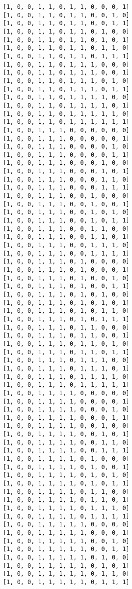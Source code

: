 \documentclass[11pt]{article}
\begin{document}
\begin{Verbatim}[commandchars=\\\{\}]
[1, 0, 0, 1, 1, 0, 1, 1, 0, 0, 0, 1]
[1, 0, 0, 1, 1, 0, 1, 1, 0, 0, 1, 0]
[1, 0, 0, 1, 1, 0, 1, 1, 0, 0, 1, 1]
[1, 0, 0, 1, 1, 0, 1, 1, 0, 1, 0, 0]
[1, 0, 0, 1, 1, 0, 1, 1, 0, 1, 0, 1]
[1, 0, 0, 1, 1, 0, 1, 1, 0, 1, 1, 0]
[1, 0, 0, 1, 1, 0, 1, 1, 0, 1, 1, 1]
[1, 0, 0, 1, 1, 0, 1, 1, 1, 0, 0, 0]
[1, 0, 0, 1, 1, 0, 1, 1, 1, 0, 0, 1]
[1, 0, 0, 1, 1, 0, 1, 1, 1, 0, 1, 0]
[1, 0, 0, 1, 1, 0, 1, 1, 1, 0, 1, 1]
[1, 0, 0, 1, 1, 0, 1, 1, 1, 1, 0, 0]
[1, 0, 0, 1, 1, 0, 1, 1, 1, 1, 0, 1]
[1, 0, 0, 1, 1, 0, 1, 1, 1, 1, 1, 0]
[1, 0, 0, 1, 1, 0, 1, 1, 1, 1, 1, 1]
[1, 0, 0, 1, 1, 1, 0, 0, 0, 0, 0, 0]
[1, 0, 0, 1, 1, 1, 0, 0, 0, 0, 0, 1]
[1, 0, 0, 1, 1, 1, 0, 0, 0, 0, 1, 0]
[1, 0, 0, 1, 1, 1, 0, 0, 0, 0, 1, 1]
[1, 0, 0, 1, 1, 1, 0, 0, 0, 1, 0, 0]
[1, 0, 0, 1, 1, 1, 0, 0, 0, 1, 0, 1]
[1, 0, 0, 1, 1, 1, 0, 0, 0, 1, 1, 0]
[1, 0, 0, 1, 1, 1, 0, 0, 0, 1, 1, 1]
[1, 0, 0, 1, 1, 1, 0, 0, 1, 0, 0, 0]
[1, 0, 0, 1, 1, 1, 0, 0, 1, 0, 0, 1]
[1, 0, 0, 1, 1, 1, 0, 0, 1, 0, 1, 0]
[1, 0, 0, 1, 1, 1, 0, 0, 1, 0, 1, 1]
[1, 0, 0, 1, 1, 1, 0, 0, 1, 1, 0, 0]
[1, 0, 0, 1, 1, 1, 0, 0, 1, 1, 0, 1]
[1, 0, 0, 1, 1, 1, 0, 0, 1, 1, 1, 0]
[1, 0, 0, 1, 1, 1, 0, 0, 1, 1, 1, 1]
[1, 0, 0, 1, 1, 1, 0, 1, 0, 0, 0, 0]
[1, 0, 0, 1, 1, 1, 0, 1, 0, 0, 0, 1]
[1, 0, 0, 1, 1, 1, 0, 1, 0, 0, 1, 0]
[1, 0, 0, 1, 1, 1, 0, 1, 0, 0, 1, 1]
[1, 0, 0, 1, 1, 1, 0, 1, 0, 1, 0, 0]
[1, 0, 0, 1, 1, 1, 0, 1, 0, 1, 0, 1]
[1, 0, 0, 1, 1, 1, 0, 1, 0, 1, 1, 0]
[1, 0, 0, 1, 1, 1, 0, 1, 0, 1, 1, 1]
[1, 0, 0, 1, 1, 1, 0, 1, 1, 0, 0, 0]
[1, 0, 0, 1, 1, 1, 0, 1, 1, 0, 0, 1]
[1, 0, 0, 1, 1, 1, 0, 1, 1, 0, 1, 0]
[1, 0, 0, 1, 1, 1, 0, 1, 1, 0, 1, 1]
[1, 0, 0, 1, 1, 1, 0, 1, 1, 1, 0, 0]
[1, 0, 0, 1, 1, 1, 0, 1, 1, 1, 0, 1]
[1, 0, 0, 1, 1, 1, 0, 1, 1, 1, 1, 0]
[1, 0, 0, 1, 1, 1, 0, 1, 1, 1, 1, 1]
[1, 0, 0, 1, 1, 1, 1, 0, 0, 0, 0, 0]
[1, 0, 0, 1, 1, 1, 1, 0, 0, 0, 0, 1]
[1, 0, 0, 1, 1, 1, 1, 0, 0, 0, 1, 0]
[1, 0, 0, 1, 1, 1, 1, 0, 0, 0, 1, 1]
[1, 0, 0, 1, 1, 1, 1, 0, 0, 1, 0, 0]
[1, 0, 0, 1, 1, 1, 1, 0, 0, 1, 0, 1]
[1, 0, 0, 1, 1, 1, 1, 0, 0, 1, 1, 0]
[1, 0, 0, 1, 1, 1, 1, 0, 0, 1, 1, 1]
[1, 0, 0, 1, 1, 1, 1, 0, 1, 0, 0, 0]
[1, 0, 0, 1, 1, 1, 1, 0, 1, 0, 0, 1]
[1, 0, 0, 1, 1, 1, 1, 0, 1, 0, 1, 0]
[1, 0, 0, 1, 1, 1, 1, 0, 1, 0, 1, 1]
[1, 0, 0, 1, 1, 1, 1, 0, 1, 1, 0, 0]
[1, 0, 0, 1, 1, 1, 1, 0, 1, 1, 0, 1]
[1, 0, 0, 1, 1, 1, 1, 0, 1, 1, 1, 0]
[1, 0, 0, 1, 1, 1, 1, 0, 1, 1, 1, 1]
[1, 0, 0, 1, 1, 1, 1, 1, 0, 0, 0, 0]
[1, 0, 0, 1, 1, 1, 1, 1, 0, 0, 0, 1]
[1, 0, 0, 1, 1, 1, 1, 1, 0, 0, 1, 0]
[1, 0, 0, 1, 1, 1, 1, 1, 0, 0, 1, 1]
[1, 0, 0, 1, 1, 1, 1, 1, 0, 1, 0, 0]
[1, 0, 0, 1, 1, 1, 1, 1, 0, 1, 0, 1]
[1, 0, 0, 1, 1, 1, 1, 1, 0, 1, 1, 0]
[1, 0, 0, 1, 1, 1, 1, 1, 0, 1, 1, 1]

\end{Verbatim}
\end{document}
